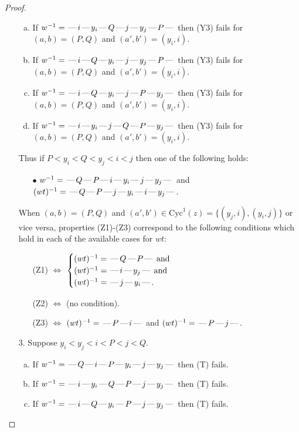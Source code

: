 \documentclass[10pt]{article}
\theoremstyle{definition}
\theoremstyle{definition}
\def\dash{\text{\hspace{0.5mm}---\hspace{0.5mm}}}
\def\Cyc{\mathrm{Cyc}}
\begin{document}
\begin{proof}
\begin{enumerate}
\begin{enumerate}[(a)]
\item If $w^{-1} = \dash i\dash y_i\dash Q\dash j\dash y_j\dash P\dash $ then (Y3) fails for $(a,b)=(P,Q)$ and $(a',b')=(y_i,i)$.
\item If $w^{-1} = \dash i\dash Q\dash y_i\dash j\dash y_j\dash P\dash $ then (Y3) fails for $(a,b)=(P,Q)$ and $(a',b')=(y_i,i)$.
\item If $w^{-1} = \dash i\dash Q\dash y_i\dash j\dash P\dash y_j\dash $ then (Y3) fails for $(a,b)=(P,Q)$ and $(a',b')=(y_i,i)$.
\item If $w^{-1} = \dash i\dash y_i\dash j\dash Q\dash P\dash y_j\dash $ then (Y3) fails for $(a,b)=(P,Q)$ and $(a',b')=(y_i,i)$.
\end{enumerate}
Thus if $P < y_i < Q < y_j < i < j$ then one of the following holds:
\begin{enumerate}
\item[$\bullet$] $w^{-1} = \dash Q\dash P\dash i\dash y_i\dash j\dash y_j\dash $ and $(wt)^{-1} = \dash Q\dash P\dash j\dash y_i\dash i\dash y_j\dash $.
\end{enumerate}
When $(a,b)= (P,Q)$ and $(a',b')\in \Cyc^1(z)=\{(y_j,i),(y_i,j)\}$ or vice versa,
properties (Z1)-(Z3) correspond to the following conditions which
hold in each of the available cases for $wt$:
\begin{enumerate}
\item[](Z1) $\Leftrightarrow$ $\begin{cases}\text{$(wt)^{-1} = \dash Q \dash P \dash$}\text{ and }\\
\text{$(wt)^{-1} = \dash i \dash y_j \dash$}\text{ and }\\
\text{$(wt)^{-1} = \dash j \dash y_i \dash$}.\end{cases}$
\item[](Z2) $\Leftrightarrow$ (no condition).
\item[](Z3) $\Leftrightarrow$ $(wt)^{-1} = \dash P \dash i \dash$  and $(wt)^{-1} = \dash P \dash j \dash$.
\end{enumerate}
\item[$3$.] Suppose $y_i < y_j < i < P < j < Q$.
\begin{enumerate}[(a)]
\item If $w^{-1} = \dash Q\dash i\dash P\dash y_i\dash j\dash y_j\dash $ then (T) fails.
\item If $w^{-1} = \dash i\dash y_i\dash Q\dash P\dash j\dash y_j\dash $ then (T) fails.
\item If $w^{-1} = \dash i\dash Q\dash y_i\dash P\dash j\dash y_j\dash $ then (T) fails.

\end{enumerate}
\end{enumerate}
\end{proof}
\end{document}
